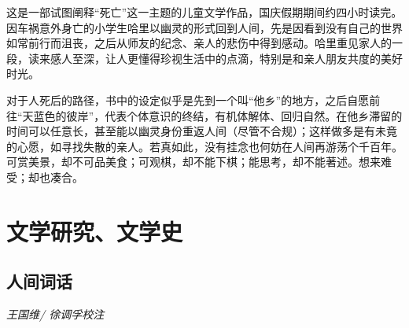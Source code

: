 \par 这是一部试图阐释“死亡”这一主题的儿童文学作品，国庆假期期间约四小时读完。因车祸意外身亡的小学生哈里以幽灵的形式回到人间，先是因看到没有自己的世界如常前行而沮丧，之后从师友的纪念、亲人的悲伤中得到感动。哈里重见家人的一段，读来感人至深，让人更懂得珍视生活中的点滴，特别是和亲人朋友共度的美好时光。
\par 对于人死后的路径，书中的设定似乎是先到一个叫“他乡”的地方，之后自愿前往“天蓝色的彼岸”，代表个体意识的终结，有机体解体、回归自然。在他乡滞留的时间可以任意长，甚至能以幽灵身份重返人间（尽管不合规）；这样做多是有未竟的心愿，如寻找失散的亲人。若真如此，没有挂念也何妨在人间再游荡个千百年。可赏美景，却不可品美食；可观棋，却不能下棋；能思考，却不能著述。想来难受；却也凑合。
\par {}


\section{文学研究、文学史}

\subsection*{人间词话}
\par \emph{王国维/ 徐调孚校注} 

